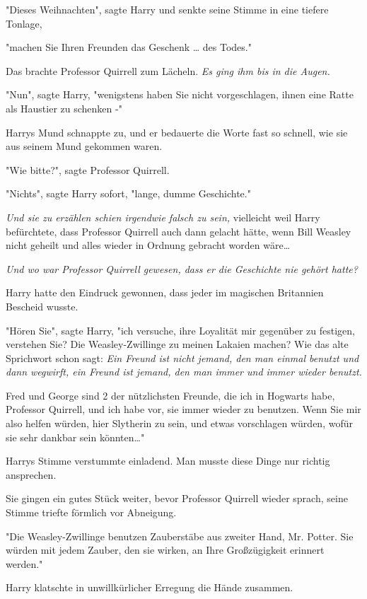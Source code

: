 {"Dieses Weihnachten", sagte Harry und senkte seine Stimme in eine tiefere Tonlage,

"machen Sie Ihren Freunden das Geschenk … des Todes."

Das brachte Professor Quirrell zum Lächeln. \emph{Es ging ihm bis in die Augen.}

"Nun", sagte Harry, "wenigstens haben Sie nicht vorgeschlagen, ihnen eine Ratte als Haustier zu schenken -"

Harrys Mund schnappte zu, und er bedauerte die Worte fast so schnell, wie sie aus seinem Mund gekommen waren.

"Wie bitte?", sagte Professor Quirrell.

"Nichts", sagte Harry sofort, "lange, dumme Geschichte."

\emph{Und sie zu erzählen schien irgendwie falsch zu sein,} vielleicht weil Harry befürchtete, dass Professor Quirrell auch dann gelacht hätte, wenn Bill Weasley nicht geheilt und alles wieder in Ordnung gebracht worden wäre…

\emph{Und wo war Professor Quirrell gewesen, dass er die Geschichte nie gehört hatte?}

Harry hatte den Eindruck gewonnen, dass jeder im magischen Britannien Bescheid wusste.

"Hören Sie", sagte Harry, "ich versuche, ihre Loyalität mir gegenüber zu festigen, verstehen Sie? Die Weasley-Zwillinge zu meinen Lakaien machen? Wie das alte Sprichwort schon sagt: \emph{Ein Freund ist nicht jemand, den man einmal benutzt und dann wegwirft, ein Freund ist jemand, den man immer und immer wieder benutzt.}

Fred und George sind 2 der nützlichsten Freunde, die ich in Hogwarts habe, Professor Quirrell, und ich habe vor, sie immer wieder zu benutzen. Wenn Sie mir also helfen würden, hier Slytherin zu sein, und etwas vorschlagen würden, wofür sie sehr dankbar sein könnten…"

Harrys Stimme verstummte einladend. Man musste diese Dinge nur richtig ansprechen.

Sie gingen ein gutes Stück weiter, bevor Professor Quirrell wieder sprach, seine Stimme triefte förmlich vor Abneigung.

"Die Weasley-Zwillinge benutzen Zauberstäbe aus zweiter Hand, Mr. Potter. Sie würden mit jedem Zauber, den sie wirken, an Ihre Großzügigkeit erinnert werden."

Harry klatschte in unwillkürlicher Erregung die Hände zusammen.

}
